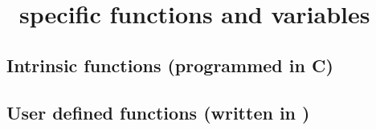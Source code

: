 \chapter{\vamps\ specific functions and variables}
\section{Intrinsic functions (programmed in C)}

\section{User defined functions (written in \slang{})}


